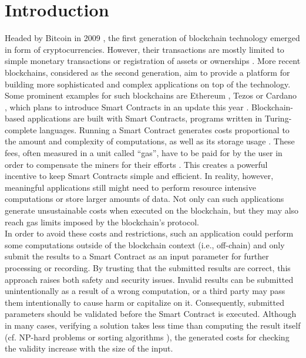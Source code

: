 \chapter{Introduction}\label{chap:introduction}
Headed by Bitcoin in 2009 \cite{bitcoin-whitepaper}, the first generation of blockchain technology emerged in form of cryptocurrencies. However, their transactions are mostly limited to simple monetary transactions or registration of assets or ownerships \cite{alharby_blockchain_2017}. More recent blockchains, considered as the second generation, aim to provide a platform for building more sophisticated and complex applications on top of the technology. Some prominent examples for such blockchains are Ethereum \cite{eth-whitepaper}, Tezos \cite{goodman_tezos_2014} or Cardano \cite{cardano_essay}, which plans to introduce Smart Contracts in an update this year \cite{cardano_alonzo}. Blockchain-based applications are built with Smart Contracts, programs written in Turing-complete languages. Running a Smart Contract generates costs proportional to the amount and complexity of computations, as well as its storage usage \cite{alharby_blockchain_2017}. These fees, often measured in a unit called ``gas'', have to be paid for by the user in order to compensate the miners for their efforts \cite{narayanan_bitcoin}. This creates a powerful incentive to keep Smart Contracts simple and efficient. In reality, however, meaningful applications still might need to perform resource intensive computations or store larger amounts of data. Not only can such applications generate unsustainable costs when executed on the blockchain, but they may also reach gas limits imposed by the blockchain's protocol. \\
In order to avoid these costs and restrictions, such an application could perform some computations outside of the blockchain context (i.e., off-chain) and only submit the results to a Smart Contract as an input parameter for further processing or recording. By trusting that the submitted results are correct, this approach raises both safety and security issues. Invalid results can be submitted unintentionally as a result of a wrong computation, or a third party may pass them intentionally to cause harm or capitalize on it. Consequently, submitted parameters should be validated before the Smart Contract is executed. Although in many cases, verifying a solution takes less time than computing the result itself (cf. NP-hard problems \cite{nph_problems} or sorting algorithms \cite{review_sorting}\cite{cpp_issorted}), the generated costs for checking the validity increase with the size of the input. \\
